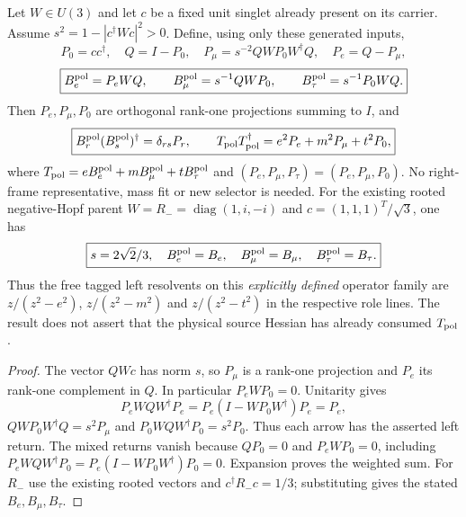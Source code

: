 \documentclass[12pt,a4paper]{article}
\begin{document}
\begin{theorem}
\label{p6:thm:v240-canonical-polar-hopf-triple}
Let $W\in U(3)$ and let $c$ be a fixed unit singlet already present on
its carrier. Assume $s^2=1-|c^\dagger Wc|^2>0$. Define, using only
these generated inputs,
\[
 P_0=cc^\dagger,\quad Q=I-P_0,\quad
 P_\mu=s^{-2}QWP_0W^\dagger Q,\quad P_e=Q-P_\mu,
\]
\begin{equation}\label{p6:eq:v240-polar-hopf-arrows}
 \boxed{B_e^{\rm pol}=P_eWQ,\qquad
 B_\mu^{\rm pol}=s^{-1}QWP_0,\qquad
 B_\tau^{\rm pol}=s^{-1}P_0WQ.}
\end{equation}
Then $P_e,P_\mu,P_0$ are orthogonal rank-one projections summing to
$I$, and
\begin{equation}\label{p6:eq:v240-hopf-full-left-return}
 \boxed{B_r^{\rm pol}(B_s^{\rm pol})^\dagger
        =\delta_{rs}P_r,\qquad
 T_{\rm pol}T_{\rm pol}^\dagger=e^2P_e+m^2P_\mu+t^2P_0,}
\end{equation}
where $T_{\rm pol}=eB_e^{\rm pol}+mB_\mu^{\rm pol}
+tB_\tau^{\rm pol}$ and $(P_e,P_\mu,P_\tau)=(P_e,P_\mu,P_0)$.
No right-frame representative, mass fit or new selector is needed.
For the existing rooted negative-Hopf parent
$W=R_-=\operatorname{diag}(1,i,-i)$ and
$c=(1,1,1)^T/\sqrt3$, one has
\[
 \boxed{s=2\sqrt2/3,\quad B_e^{\rm pol}=B_e,\quad
 B_\mu^{\rm pol}=B_\mu,\quad B_\tau^{\rm pol}=B_\tau.}
\]
Thus the free tagged left resolvents on this \emph{explicitly defined}
operator family are $z/(z^2-e^2)$, $z/(z^2-m^2)$ and
$z/(z^2-t^2)$ in the respective role lines. The result does not
assert that the physical source Hessian has already consumed
$T_{\rm pol}$.
\end{theorem}
\begin{proof}
The vector $QWc$ has norm $s$, so $P_\mu$ is a rank-one
projection and $P_e$ its rank-one complement in $Q$. In particular
$P_eWP_0=0$. Unitarity gives
\[
 P_eWQW^\dagger P_e=P_e(I-WP_0W^\dagger)P_e=P_e,
\]
$QWP_0W^\dagger Q=s^2P_\mu$ and
$P_0WQW^\dagger P_0=s^2P_0$. Thus each arrow has the asserted
left return. The mixed returns vanish because $QP_0=0$ and
$P_eWP_0=0$, including
$P_eWQW^\dagger P_0=P_e(I-WP_0W^\dagger)P_0=0$.
Expansion proves the weighted sum. For $R_-$ use the existing rooted
vectors and $c^\dagger R_-c=1/3$; substituting gives the stated
$B_e,B_\mu,B_\tau$.
\end{proof}
\end{document}
